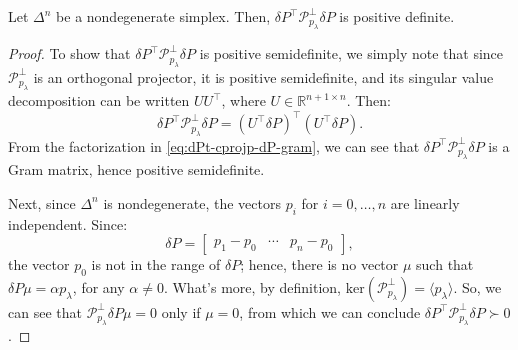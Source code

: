 \documentclass[eikonal.tex]{subfiles}
\begin{document}


\begin{lemma}\label{lemma:dPt-cprojp-dP-pd}
  Let $\Delta^n$ be a nondegenerate simplex. Then,
  $\delta P^\top \mathcal{P}^\perp_{p_\lambda} \delta P$ is positive
  definite.
\end{lemma}

\begin{proof}
  To show that $\delta P^\top \mathcal{P}^\perp_{p_\lambda} \delta P$
  is positive semidefinite, we simply note that since
  $\mathcal{P}^\perp_{p_\lambda}$ is an orthogonal projector, it is
  positive semidefinite, and its singular value decomposition can be
  written $UU^\top$, where $U \in \mathbb{R}^{n+1 \times n}$. Then:
  \begin{equation}\label{eq:dPt-cprojp-dP-gram}
    \delta P^\top \mathcal{P}^\perp_{p_\lambda} \delta P = {(U^\top \delta P)}^\top {(U^\top \delta P)}.
  \end{equation}
  From the factorization in \cref{eq:dPt-cprojp-dP-gram}, we can see
  that $\delta P^\top \mathcal{P}^\perp_{p_\lambda} \delta P$ is a
  Gram matrix, hence positive semidefinite.

  Next, since $\Delta^n$ is nondegenerate, the vectors $p_i$ for
  $i = 0, \hdots, n$ are linearly independent. Since:
  \begin{equation*}
    \delta P = \begin{bmatrix} p_1 - p_0 & \cdots & p_n - p_0 \end{bmatrix},
  \end{equation*}
  the vector $p_0$ is not in the range of $\delta P$; hence, there is
  no vector $\mu$ such that $\delta P \mu = \alpha p_\lambda$, for any
  $\alpha \neq 0$. What's more, by definition,
  $\text{ker}(\mathcal{P}_{p_\lambda}^\perp) = \langle p_\lambda
  \rangle$. So, we can see that
  $\mathcal{P}^\perp_{p_\lambda} \delta P \mu = 0$ only if $\mu = 0$,
  from which we can conclude
  $\delta P^\top \mathcal{P}^\perp_{p_\lambda} \delta P \succ 0$.
\end{proof}
\end{document}
